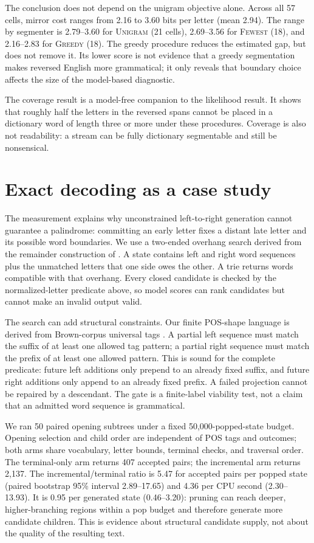 \documentclass[11pt]{article}
\begin{document}
The conclusion does not depend on the unigram objective alone. Across all 57
cells, mirror cost ranges from 2.16 to 3.60 bits per letter (mean 2.94).
The range by segmenter is 2.79--3.60 for \textsc{Unigram} (21 cells),
2.69--3.56 for \textsc{Fewest} (18), and 2.16--2.83 for \textsc{Greedy} (18).
The greedy procedure reduces the estimated gap, but does not remove it. Its
lower score is not evidence that a greedy segmentation makes reversed English
more grammatical; it only reveals that boundary choice affects the size of the
model-based diagnostic.

The coverage result is a model-free companion to the likelihood result. It
shows that roughly half the letters in the reversed spans cannot be placed in a
dictionary word of length three or more under these procedures. Coverage is
also not readability: a stream can be fully dictionary segmentable and still
be nonsensical.

\section{Exact decoding as a case study}
\label{sec:decoder}

The measurement explains why unconstrained left-to-right generation cannot
guarantee a palindrome: committing an early letter fixes a distant late letter
and its possible word boundaries. We use a two-ended overhang search derived
from the remainder construction of \citet{norvig2016palindrome}. A state
contains left and right word sequences plus the unmatched letters that one side
owes the other. A trie returns words compatible with that overhang. Every
closed candidate is checked by the normalized-letter predicate above, so model
scores can rank candidates but cannot make an invalid output valid.

The search can add structural constraints. Our finite POS-shape language is
derived from Brown-corpus universal tags \citep{francis1979brown,bird2009nltk,
petrov2012universal}. A partial left sequence must match the suffix of at
least one allowed tag pattern; a partial right sequence must match the prefix
of at least one allowed pattern. This is sound for the complete predicate:
future left additions only prepend to an already fixed suffix, and future right
additions only append to an already fixed prefix. A failed projection cannot
be repaired by a descendant. The gate is a finite-label viability test, not a
claim that an admitted word sequence is grammatical.

We ran 50 paired opening subtrees under a fixed 50,000-popped-state budget.
Opening selection and child order are independent of POS tags and outcomes;
both arms share vocabulary, letter bounds, terminal checks, and traversal
order. The terminal-only arm returns 407 accepted pairs; the incremental arm
returns 2,137. The incremental/terminal ratio is 5.47 for accepted pairs per
popped state (paired bootstrap 95\% interval 2.89--17.65) and 4.36 per CPU
second (2.30--13.93). It is 0.95 per generated state (0.46--3.20): pruning can
reach deeper, higher-branching regions within a pop budget and therefore
generate more candidate children. This is evidence about structural candidate
supply, not about the quality of the resulting text.
\end{document}
